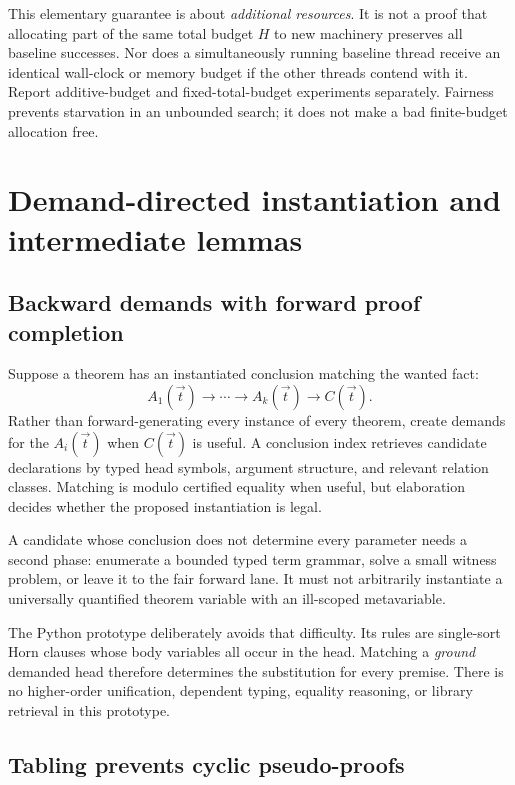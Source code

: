 This elementary guarantee is about \emph{additional resources}. It is not a
proof that allocating part of the same total budget $H$ to new machinery
preserves all baseline successes. Nor does a simultaneously running baseline
thread receive an identical wall-clock or memory budget if the other threads
contend with it. Report additive-budget and fixed-total-budget experiments
separately. Fairness prevents starvation in an unbounded search; it does not
make a bad finite-budget allocation free.

\section{Demand-directed instantiation and intermediate lemmas}

\subsection{Backward demands with forward proof completion}

Suppose a theorem has an instantiated conclusion matching the wanted fact:
\[
 A_1(\vec t)\to\cdots\to A_k(\vec t)\to C(\vec t).
\]
Rather than forward-generating every instance of every theorem, create demands
for the $A_i(\vec t)$ when $C(\vec t)$ is useful. A conclusion index retrieves
candidate declarations by typed head symbols, argument structure, and relevant
relation classes. Matching is modulo certified equality when useful, but
elaboration decides whether the proposed instantiation is legal.

A candidate whose conclusion does not determine every parameter needs a second
phase: enumerate a bounded typed term grammar, solve a small witness problem,
or leave it to the fair forward lane. It must not arbitrarily instantiate a
universally quantified theorem variable with an ill-scoped metavariable.

The Python prototype deliberately avoids that difficulty. Its rules are
single-sort Horn clauses whose body variables all occur in the head. Matching
a \emph{ground} demanded head therefore determines the substitution for every
premise. There is no higher-order unification, dependent typing, equality
reasoning, or library retrieval in this prototype.

\subsection{Tabling prevents cyclic pseudo-proofs}

